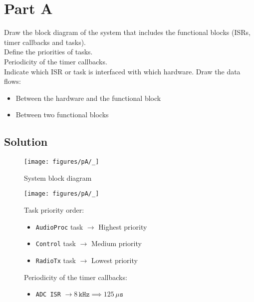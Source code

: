 \section*{Part A}

Draw the block diagram of the system that includes the functional blocks (ISRs, timer callbacks and tasks). \\
Define the priorities of tasks. \\
Periodicity of the timer callbacks. \\
Indicate which ISR or task is interfaced with which hardware.
Draw the data flows:
\begin{itemize}[noitemsep, topsep=0pt]
    \item Between the hardware and the functional block
    \item Between two functional blocks
\end{itemize}

\vspace*{-1em}
\subsection*{Solution}
\vspace*{-0.5em}

\begin{figure*}[htbp]
    \centering
    \texttt{[image: figures/pA/\_]}
    \vspace*{-3em}
    \caption{System block diagram}
\end{figure*}

\vspace*{-1em}
\begin{figure*}[htbp]
    \centering
    \begin{minipage}{0.45\linewidth}
        \centering
        \texttt{[image: figures/pA/\_]}
    \end{minipage}
    \hfill
    \begin{minipage}{0.49\linewidth}
        Task priority order:
        \begin{itemize}[noitemsep, topsep=0pt]
            \item \texttt{AudioProc} task \( \to \) Highest priority
            \item \texttt{Control} task \( \to \) Medium priority
            \item \texttt{RadioTx} task \( \to \) Lowest priority
        \end{itemize}

        \vspace*{1em}
        Periodicity of the timer callbacks:
        \begin{itemize}[noitemsep, topsep=0pt]
            \item \texttt{ADC ISR} \( \to 8\,\texttt{kHz} \implies 125\,\mu\texttt{s} \)
        \end{itemize}
    \end{minipage}
\end{figure*}
